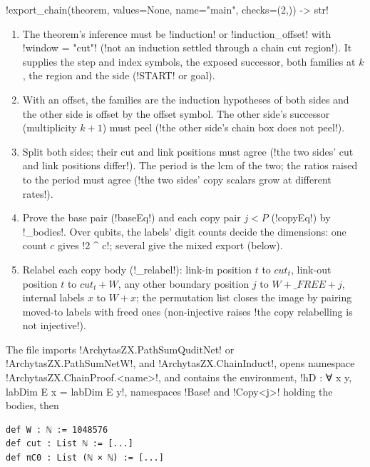 {{{\begin{signature}
\lexpy!export_chain(theorem, values=None, name="main", checks=(2,)) -> str!
\end{signature}
\begin{algorithm}\label{alg:lean-export-chain}
\begin{enumerate}
\item The theorem's inference must be \lexcode!induction! or \lexcode!induction_offset! with
\lexcode!window = "cut"! (\lexcode!not an induction settled through a chain cut region!). It supplies
the step and index symbols, the exposed successor, both families at $k$, the region and the side
(\lexcode!START! or goal).
\item With an offset, the families are the induction hypotheses of both sides and the other side
is offset by the offset symbol. The other side's successor (multiplicity $k+1$) must peel
(\lexcode!the other side's chain box does not peel!).
\item Split both sides; their cut and link positions must agree (\lexcode!the two sides' cut and link positions differ!). The period is the lcm of the two; the ratios raised to the period must agree
(\lexcode!the two sides' copy scalars grow at different rates!).
\item Prove the base pair (\lexlean!baseEq!) and each copy pair $j < P$ (\lexlean!copyEq!) by
\lexpy!_bodies!. Over qubits, the labels' digit counts decide the dimensions: one count $c$ gives
\lexlean!2 ^ c!; several give the mixed export (below).
\item Relabel each copy body (\lexpy!_relabel!): link-in position $t$ to $\mathit{cut}_t$, link-out
position $t$ to $\mathit{cut}_t + W$, any other boundary position $j$ to $W + \_FREE + j$, internal
labels $x$ to $W+x$; the permutation list closes the image by pairing moved-to labels with freed
ones (non-injective raises \lexcode!the copy relabelling is not injective!).
\end{enumerate}
\end{algorithm}
The file imports \lexlean!ArchytasZX.PathSumQuditNet! or \lexlean!ArchytasZX.PathSumNetW!, and
\lexlean!ArchytasZX.ChainInduct!, opens namespace \lexlean!ArchytasZX.ChainProof.<name>!, and contains the
environment, \lexlean!hD : ∀ x y, labDim E x = labDim E y!, namespaces \lexlean!Base! and
\lexlean!Copy<j>! holding the bodies, then
\begin{lstlisting}[style=lexlean]
def W : ℕ := 1048576
def cut : List ℕ := [...]
def πC0 : List (ℕ × ℕ) := [...]

\end{lstlisting}}}}
